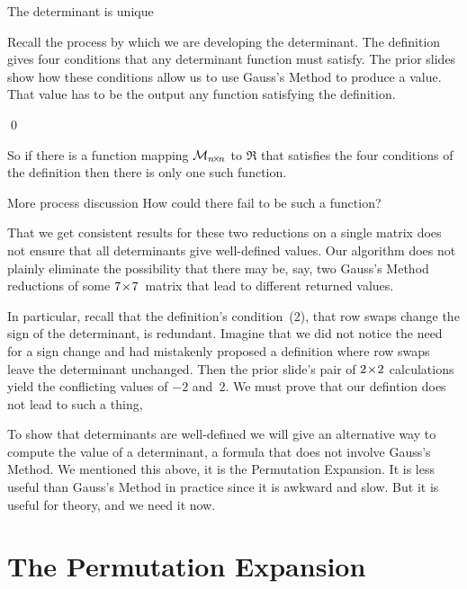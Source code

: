 \documentclass[10pt,t]{beamer}
\begin{document}
\begin{frame}{The  determinant is unique}

Recall the process by which we are developing the determinant.
The definition gives four conditions that any determinant function must
satisfy.
The prior slides show how these conditions 
allow us to use Gauss's Method to produce a value.
That value has to be the output any function satisfying
the definition.


\lm[lm:DetFcnIsUnique]

\pause 
\pf 
{}
\qed

\medskip
So if there is a function mapping $\mathcal{M}_{n \! \times \! n}$ to $\Re$ that
satisfies the four conditions of the definition then there is only one such
function.
\end{frame}
\begin{frame}{More process discussion}
How could there fail to be such a function?

\pause
That we get consistent results for these two
reductions on a single matrix does not ensure that all determinants
give well-defined values.
Our algorithm does not
plainly eliminate the possibility that there may be, say,
two Gauss's Method reductions of some $7 \! \times \! 7$~matrix that lead to different 
returned values.
\end{frame}
\begin{frame}
In particular, recall that the definition's condition~(2),
that row swaps change the sign of the determinant, is 
redundant.
Imagine that we did not notice the need for a sign change and had mistakenly
proposed a definition where row swaps leave the determinant unchanged.
Then the prior slide's pair of $2 \! \times \! 2$ calculations yield the
conflicting values of $-2$ and~$2$.
We must prove that our defintion does not lead to 
such a thing, 

\pause
To show that determinants are well-defined 
we will give an alternative way to compute
the value of a determinant, a formula that does not involve 
Gauss's Method.
We mentioned this above, it is the Permutation Expansion. 
It is less useful than Gauss's Method in practice since it 
is awkward and slow.
But it is useful for theory, and we need it now.
\end{frame}



\section{The Permutation Expansion}
\end{document}
